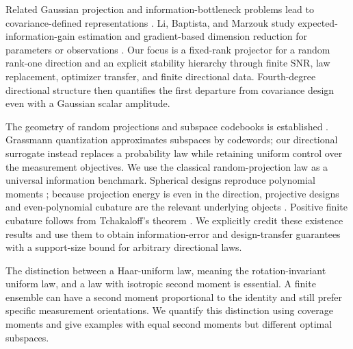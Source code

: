 \documentclass[lettersize,onecolumn]{IEEEtran}
\theoremstyle{remark}
\theoremstyle{definition}
\begin{document}
Related Gaussian projection and information-bottleneck problems lead to covariance-defined representations \cite{giraldi2018,chechik2005}. Li, Baptista, and Marzouk study expected-information-gain estimation and gradient-based dimension reduction for parameters or observations \cite{li2026}. Our focus is a fixed-rank projector for a random rank-one direction and an explicit stability hierarchy through finite SNR, law replacement, optimizer transfer, and finite directional data. Fourth-degree directional structure then quantifies the first departure from covariance design even with a Gaussian scalar amplitude.

The geometry of random projections and subspace codebooks is established \cite{lu2007,kang2024,love2003,dai2008}. Grassmann quantization approximates subspaces by codewords; our directional surrogate instead replaces a probability law while retaining uniform control over the measurement objectives. We use the classical random-projection law as a universal information benchmark. Spherical designs reproduce polynomial moments \cite{delsarte1977,reznick1995}; because projection energy is even in the direction, projective designs and even-polynomial cubature are the relevant underlying objects \cite{hughes2021}. Positive finite cubature follows from Tchakaloff's theorem \cite{bayer2006}. We explicitly credit these existence results and use them to obtain information-error and design-transfer guarantees with a support-size bound for arbitrary directional laws.

The distinction between a Haar-uniform law, meaning the rotation-invariant uniform law, and a law with isotropic second moment is essential. A finite ensemble can have a second moment proportional to the identity and still prefer specific measurement orientations. We quantify this distinction using coverage moments and give examples with equal second moments but different optimal subspaces.
\end{document}
